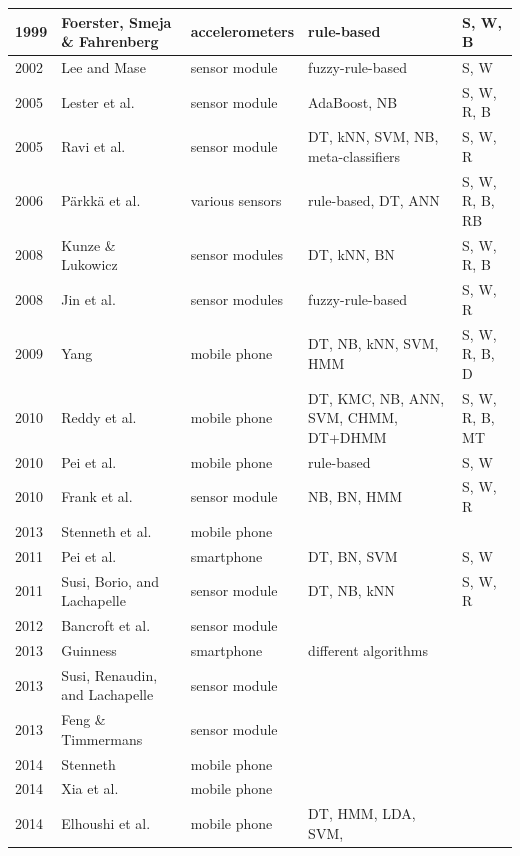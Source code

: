 \begin{center}
\begin{longtable} {|l|>{\raggedright}p{3cm}|p{2.4cm}|>{\centering\arraybackslash}p{2.5cm}|>{\centering\arraybackslash}p{2.2cm}|}
1999 & Foerster, Smeja \& Fahrenberg & accelerometers & rule-based & S, W, B \\ \hline
2002 & Lee and Mase & sensor module & fuzzy-rule-based & S, W \\ \hline
2005 & Lester et al. & sensor module & AdaBoost, NB & S, W, R, B \\ \hline
2005 & Ravi et al. & sensor module & DT, kNN, SVM, NB, meta-classifiers& S, W, R\\ \hline
2006 & P\"{a}rkk\"{a} et al. & various sensors & rule-based, DT, ANN & S, W, R, B, RB \\ \hline
2008 & Kunze \& Lukowicz & sensor modules & DT, kNN, BN & S, W, R, B \\ \hline
2008 & Jin et al. & sensor modules & fuzzy-rule-based & S, W, R \\ \hline
2009 & Yang & mobile phone & DT, NB, kNN, SVM, HMM & S, W, R, B, D \\ \hline
2010 & Reddy et al. & mobile phone & DT, KMC, NB, ANN, SVM, CHMM, DT+DHMM & S, W, R, B, MT \\ \hline 
2010 & Pei et al. & mobile phone & rule-based &  S, W \\ \hline
2010 & Frank et al. & sensor module & NB, BN, HMM & S, W, R \\ \hline
2013 & Stenneth et al. & mobile phone  & & \\ \hline
2011 & Pei et al. & smartphone & DT, BN, SVM & S, W \\ \hline
2011 & Susi, Borio, and Lachapelle & sensor module & DT, NB, kNN & S, W, R\\ \hline
2012 & Bancroft et al. & sensor module & & \\ \hline
2013 & Guinness & smartphone & 20 different algorithms& \\ \hline
2013 & Susi, Renaudin, and Lachapelle & sensor module & & \\ \hline
2013 & Feng \& Timmermans & sensor module  & & \\ \hline
2014 & Stenneth & mobile phone & & \\ \hline
2014 & Xia et al. & mobile phone & & \\ \hline
2014 & Elhoushi et al. & mobile phone & DT, HMM, LDA, SVM, & \\ \hline

\end{longtable}
\end{center}

